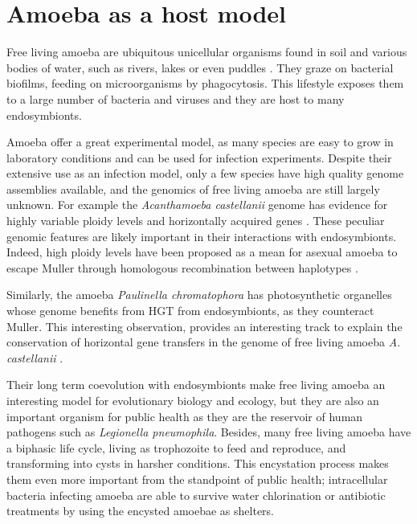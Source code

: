 \section{Amoeba as a host model}

Free living amoeba are ubiquitous unicellular organisms found in soil and various bodies of water, such as rivers, lakes \cite{John1995} or even puddles \cite{Sakamoto2009}. They graze on bacterial biofilms, feeding on microorganisms by phagocytosis. This lifestyle exposes them to a large number of bacteria and viruses and they are host to many endosymbionts. 

Amoeba offer a great experimental model, as many species are easy to grow in laboratory conditions and can be used for infection experiments. Despite their extensive use as an infection model, only a few species have high quality genome assemblies available, and the genomics of free living amoeba are still largely unknown. For example the \textit{Acanthamoeba castellanii} genome has evidence for highly variable ploidy levels \cite{Maciver2016} and horizontally acquired genes \cite{clarke2013}. These peculiar genomic features are likely important in their interactions with endosymbionts. Indeed, high ploidy levels have been proposed as a mean for asexual amoeba to escape \Gls{Muller} through homologous recombination between haplotypes \cite{Maciver2016}.

Similarly, the amoeba \textit{Paulinella chromatophora} has photosynthetic organelles whose genome benefits from HGT from endosymbionts, as they counteract \Gls{Muller}. This interesting observation, provides an interesting track to explain the conservation of horizontal gene transfers in the genome of free living amoeba \textit{A. castellanii} \cite{clarke2013}.

Their long term coevolution with endosymbionts make free living amoeba an interesting model for evolutionary biology and ecology, but they are also an important organism for public health as they are the reservoir of human pathogens such as \textit{Legionella pneumophila}. Besides, many free living amoeba have a biphasic life cycle, living as trophozoite to feed and reproduce, and transforming into cysts in harsher conditions. This encystation process makes them even more important from the standpoint of public health; intracellular bacteria infecting amoeba are able to survive water chlorination or antibiotic treatments by using the encysted amoebae as shelters.

